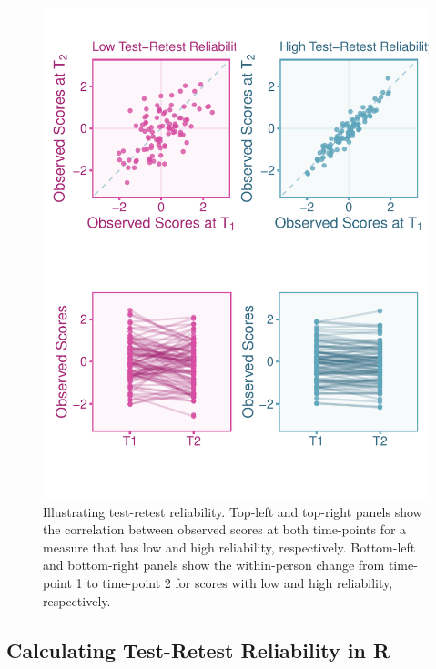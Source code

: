 \documentclass[
  letterpaper,
  DIV=11,
  numbers=noendperiod]{scrreprt}
\begin{document}
\begin{figure}

{\centering \includegraphics{unreliability_files/figure-pdf/unnamed-chunk-8-1.pdf}

}

\caption{Illustrating test-retest reliability. Top-left and top-right
panels show the correlation between observed scores at both time-points
for a measure that has low and high reliability, respectively.
Bottom-left and bottom-right panels show the within-person change from
time-point 1 to time-point 2 for scores with low and high reliability,
respectively.}

\end{figure}

\hypertarget{calculating-test-retest-reliability-in-r}{%
\subsection{Calculating Test-Retest Reliability in
R}\label{calculating-test-retest-reliability-in-r}}
\end{document}
